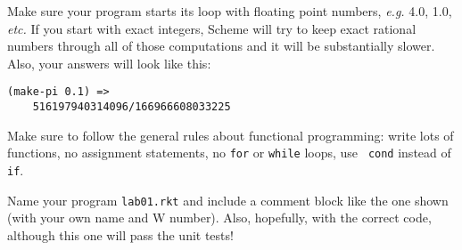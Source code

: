 \documentclass{article}
\begin{document}
\begin{multicols}{2}
\begin{description}
Make sure your program starts its loop with floating point numbers,
{\em e.g.} 4.0, 1.0, {\em etc.}  If you start with exact integers,
Scheme will try to keep exact rational numbers through all of those
computations and it will be substantially slower.  Also, your answers
will look like this:
\begin{Verbatim}[frame=single]
(make-pi 0.1) => 
    516197940314096/166966608033225
\end{Verbatim}

Make sure to follow the general rules about functional programming:
write lots of functions, no
assignment statements, no {\tt for} or {\tt while} loops, use {\tt
  cond} instead of {\tt if}.

Name your program {\tt lab01.rkt} and include a comment block like the
one shown (with your own name and W number).  Also, hopefully, with
the correct code, although this one will pass the unit tests!


\end{description}
\end{multicols}
\end{document}
